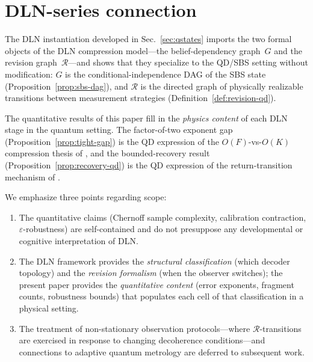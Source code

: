 
\section{DLN-series connection}
\label{sec:dln-brief}

The DLN instantiation developed in Sec.~\ref{sec:qstates} imports the
two formal objects of the DLN compression model---the belief-dependency
graph~$G$ and the revision graph~$\mathcal{R}$---and shows that they
specialize to the QD/SBS setting without modification:
$G$ is the conditional-independence DAG of the SBS state
(Proposition~\ref{prop:sbs-dag}), and
$\mathcal{R}$ is the directed graph of physically realizable transitions
between measurement strategies
(Definition~\ref{def:revision-qd}).

The quantitative results of this paper fill in the \emph{physics content}
of each DLN stage in the quantum setting.
The factor-of-two exponent gap
(Proposition~\ref{prop:tight-gap}) is the QD expression of the
$O(F)$-vs-$O(K)$ compression thesis of
\citep[Proposition~1(i)]{WuDLNCompression2026preprint},
and the bounded-recovery result
(Proposition~\ref{prop:recovery-qd}) is the QD expression of the
return-transition mechanism of
\citep[Proposition~1(iii)]{WuDLNCompression2026preprint}.

We emphasize three points regarding scope:
\begin{enumerate}[leftmargin=2em]
\item The quantitative claims (Chernoff sample complexity, calibration
  contraction, $\varepsilon$-robustness) are self-contained and do not
  presuppose any developmental or cognitive interpretation of DLN.
\item The DLN framework provides the \emph{structural classification}
  (which decoder topology) and the \emph{revision formalism} (when the
  observer switches); the present paper provides the \emph{quantitative
  content} (error exponents, fragment counts, robustness bounds) that
  populates each cell of that classification in a physical setting.
\item The treatment of non-stationary observation protocols---where
  $\mathcal{R}$-transitions are exercised in response to changing
  decoherence conditions---and connections to adaptive quantum
  metrology are deferred to subsequent work.
\end{enumerate}


